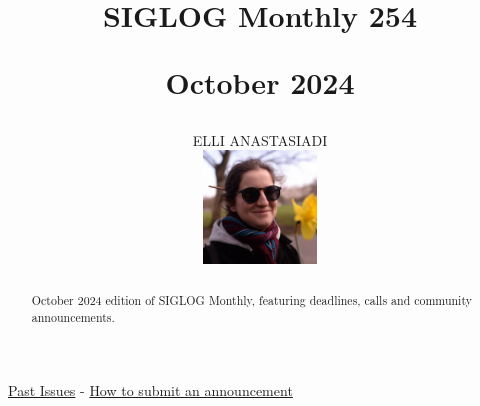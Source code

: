 \documentclass[prodmode,acmtecs]{acmsmall} %
\newcounter{colstart}
\begin{document}
\setcounter{colstart}{\thepage}

\title{{\huge\sc SIGLOG Monthly 254}

 October 2024}\author{ELLI ANASTASIADI\vspace*{-2.6cm}\begin{flushright}\includegraphics[width=30mm]{elli_anastasiadi.png}\end{flushright}}\begin{abstract}October 2024 edition of SIGLOG Monthly, featuring deadlines, calls and community announcements.
\end{abstract}


\maketitlee

\href{https://lics.siglog.org/newsletters/}{Past Issues}
 - 
\href{https://lics.siglog.org/newsletters/inst.html}{How to submit an announcement}
\end{document}
